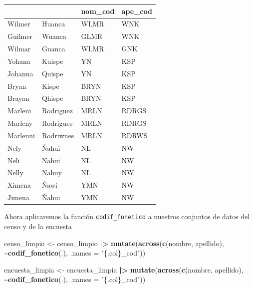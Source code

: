 \documentclass[
  12pt,
]{book}
\newenvironment{Shaded}{\begin{snugshade}}{\end{snugshade}}
\newcommand{\AttributeTok}[1]{\textcolor[rgb]{0.13,0.29,0.53}{#1}}
\newcommand{\FunctionTok}[1]{\textcolor[rgb]{0.13,0.29,0.53}{\textbf{#1}}}
\newcommand{\NormalTok}[1]{#1}
\newcommand{\OtherTok}[1]{\textcolor[rgb]{0.56,0.35,0.01}{#1}}
\newcommand{\SpecialCharTok}[1]{\textcolor[rgb]{0.81,0.36,0.00}{\textbf{#1}}}
\newcommand{\StringTok}[1]{\textcolor[rgb]{0.31,0.60,0.02}{#1}}
\begin{document}
\begin{table}[t]
\fontsize{12.0pt}{14.0pt}\selectfont
\begin{tabular*}{\linewidth}{@{\extracolsep{\fill}}llll}
\toprule
{\bfseries \cellcolor[HTML]{F9F9F9}{nombre}} & {\bfseries \cellcolor[HTML]{F9F9F9}{apellido}} & nom\_cod & ape\_cod \\ 
\midrule\addlinespace[2.5pt]
Wilmer & Huanca & WLMR & WNK \\ 
Guilmer & Wuanca & GLMR & WNK \\ 
Wilmar & Guanca & WLMR & GNK \\ 
Yohana & Kuispe & YN & KSP \\ 
Johanna & Quispe & YN & KSP \\ 
Bryan & Kispe & BRYN & KSP \\ 
Brayan & Qhispe & BRYN & KSP \\ 
Marleni & Rodriguez & MRLN & RDRGS \\ 
Marleny & Rodrigues & MRLN & RDRGS \\ 
Marlenni & Rodriwues & MRLN & RDRWS \\ 
Nely & \~Nahui & NL & NW \\ 
Neli & Nahui & NL & NW \\ 
Nelly & Nahuy & NL & NW \\ 
Ximena & \~Nawi & YMN & NW \\ 
Jimena & \~Nahui & YMN & NW \\ 
\bottomrule
\end{tabular*}
\end{table}

Ahora aplicaremos la función \texttt{codif\_fonetico} a nuestros conjuntos de datos del censo y de la encuesta

\begin{Shaded}
\begin{Highlighting}[]
\NormalTok{censo\_limpio }\OtherTok{\textless{}{-}}\NormalTok{ censo\_limpio }\SpecialCharTok{|\textgreater{}} 
                \FunctionTok{mutate}\NormalTok{(}\FunctionTok{across}\NormalTok{(}\FunctionTok{c}\NormalTok{(nombre, apellido), }\SpecialCharTok{\textasciitilde{}}\FunctionTok{codif\_fonetico}\NormalTok{(.), }\AttributeTok{.names =} \StringTok{"\{.col\}\_cod"}\NormalTok{))}

\NormalTok{encuesta\_limpia }\OtherTok{\textless{}{-}}\NormalTok{ encuesta\_limpia }\SpecialCharTok{|\textgreater{}} 
                   \FunctionTok{mutate}\NormalTok{(}\FunctionTok{across}\NormalTok{(}\FunctionTok{c}\NormalTok{(nombre, apellido), }\SpecialCharTok{\textasciitilde{}}\FunctionTok{codif\_fonetico}\NormalTok{(.), }\AttributeTok{.names =} \StringTok{"\{.col\}\_cod"}\NormalTok{))}
\end{Highlighting}
\end{Shaded}
\end{document}
